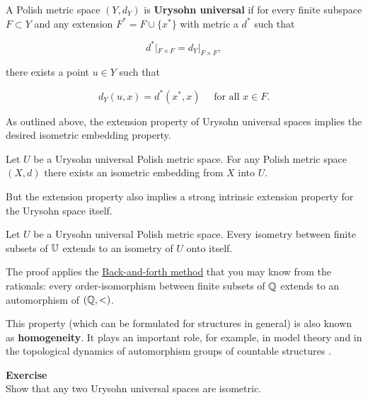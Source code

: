 \begin{definition}A Polish metric space $(Y,d_Y)$ is \textbf{Urysohn universal} if for every finite subspace $F \subset Y$ and any extension $F^* = F \cup \{x^*\}$ with metric a $d^*$ such that

\begin{equation}
d^*|_{F\times F} = d_Y|_{F\times F},
\end{equation}

there exists a point $u \in Y$ such that

\begin{equation}
d_{Y}(u,x) = d^*(x^*,x) \quad \text{ for all $x \in F$}.
\end{equation}

\end{definition}As outlined above, the extension property of Urysohn universal spaces implies the desired isometric embedding property.

\begin{proposition}\label{prop-urysohn-embedding}Let $U$ be a Urysohn universal Polish metric space. For any Polish metric space $(X,d)$ there exists an isometric embedding from $X$ into $U$.

\end{proposition}But the extension property also implies a strong intrinsic extension property for the Urysohn space itself.

\begin{proposition}\label{prop-urysohn-extension}Let $U$ be a Urysohn universal Polish metric space. Every isometry between finite subsets of $\mathbb{U}$ extends to an isometry of $U$ onto itself.

\end{proposition}The proof applies the \href{https://en.wikipedia.org/wiki/Back-and-forth\_method}{Back-and-forth method} that you may know from the rationals: every order-isomorphism between finite subsets of $\mathbb{Q}$ extends to an automorphism of $(\mathbb{Q},<)$.

This property (which can be formulated for structures in general) is also known as \textbf{homogeneity}. It plays an important role, for example, in
model theory \cite{Macpherson:2011a} and in the topological dynamics of automorphism groups of countable structures \cite{Kechris-Pestov-Todorcevic:2005a}.

\begin{framed}
\textbf{Exercise}\\
Show that any two Urysohn universal spaces are isometric.
\end{framed}

